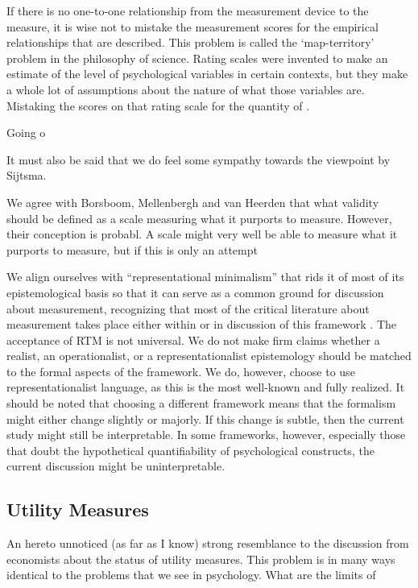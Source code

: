 \documentclass[utf8]{FrontiersinVancouver}
\begin{document}
If there is no one-to-one relationship from the measurement device to the measure, it is wise not to mistake the measurement scores for the empirical relationships that are described. This problem is called the `map-territory' problem in the philosophy of science. Rating scales were invented to make an estimate of the level of psychological variables in certain contexts, but they make a whole lot of assumptions about the nature of what those variables are. Mistaking the scores on that rating scale for the quantity of . 

Going o

It must also be said that we do feel some sympathy towards the viewpoint by Sijtsma\citep{sijtsmaPsychologicalMeasurementPhysics2012}. 

We agree with Borsboom, Mellenbergh and van Heerden that what validity should be defined as a scale measuring what it purports to measure. However, their conception is probabl. A scale might very well be able to measure what it purports to measure, but if this is only an attempt 

We align ourselves with ``representational minimalism'' that rids it of most of its epistemological basis so that it can serve as a common ground for discussion about measurement, recognizing that most of the critical literature about measurement takes place either within or in discussion of this framework \citep{vessonenRepresentationMeasurement2021}. The acceptance of RTM is not universal. We do not make firm claims whether a realist, an operationalist, or a representationalist epistemology should be matched to the formal aspects of the framework. We do, however, choose to use representationalist language, as this is the most well-known and fully realized. It should be noted that choosing a different framework means that the formalism might either change slightly or majorly. If this change is subtle, then the current study might still be interpretable. In some frameworks, however, especially those that doubt the hypothetical quantifiability of psychological constructs, the current discussion might be uninterpretable.

\subsection{Utility Measures}
An hereto unnoticed (as far as I know) strong resemblance to the discussion from economists about the status of utility measures. This problem is in many ways  identical to the problems that we see in psychology. What are the limits of 
\end{document}
